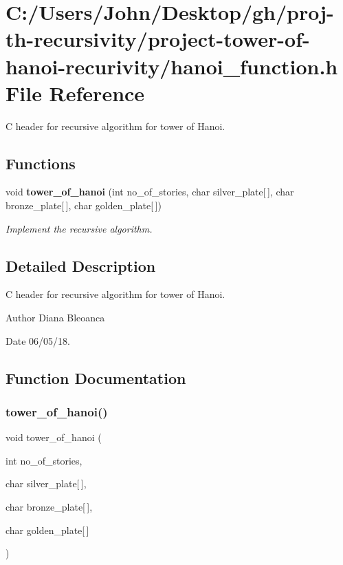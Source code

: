\section{C\+:/\+Users/\+John/\+Desktop/gh/proj-\/th-\/recursivity/project-\/tower-\/of-\/hanoi-\/recurivity/hanoi\+\_\+function.h File Reference}
\label{hanoi__function_8h}


C header for recursive algorithm for tower of Hanoi.  


\subsection*{Functions}
\begin{DoxyCompactItemize}
\item 
void \textbf{ tower\+\_\+of\+\_\+hanoi} (int no\+\_\+of\+\_\+stories, char silver\+\_\+plate[$\,$], char bronze\+\_\+plate[$\,$], char golden\+\_\+plate[$\,$])
\begin{DoxyCompactList}\small\item\em Implement the recursive algorithm. \end{DoxyCompactList}\end{DoxyCompactItemize}


\subsection{Detailed Description}
C header for recursive algorithm for tower of Hanoi. 

\begin{DoxyAuthor}{Author}
Diana Bleoanca 
\end{DoxyAuthor}
\begin{DoxyDate}{Date}
06/05/18. 
\end{DoxyDate}


\subsection{Function Documentation}
\mbox{\label{hanoi__function_8h_a931b9d5bea64dd7a0daa829856a010aa}} 
\subsubsection{tower\+\_\+of\+\_\+hanoi()}
{\footnotesize\ttfamily void tower\+\_\+of\+\_\+hanoi (\begin{DoxyParamCaption}\item[{int}]{no\+\_\+of\+\_\+stories,  }\item[{char}]{silver\+\_\+plate[$\,$],  }\item[{char}]{bronze\+\_\+plate[$\,$],  }\item[{char}]{golden\+\_\+plate[$\,$] }\end{DoxyParamCaption})}



